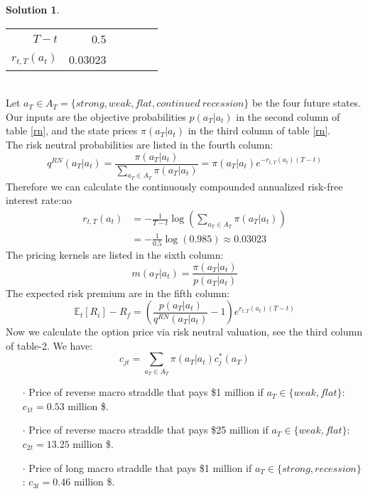 \documentclass[a4paper, 10pt]{article}
\theoremstyle{definition}
\theoremstyle{hSol}
\newtheorem*{solution}{Solution}
\begin{document}
\begin{solution}
\begin{table}[htbp]
\begin{tabular}{rrrrrr}
    $T-t$ & 0.5 \\
    $r_{t,T}(a_t)$ & 0.03023 \\
    \bottomrule
    \end{tabular}%
  \label{tab:addlabel}%
\end{table}%
~\\
Let $a_T \in A_T = \{strong, weak, flat, continued~recession\}$ be the four future states. Our inputs are the objective probabilities $p(a_T|a_t)$ in the second column of table \ref{rn}, and the state prices $\pi(a_T|a_t)$ in the third column of table \ref{rn}. \\
The risk neutral probabilities are listed in the fourth column:
\begin{equation}
  q^{RN}(a_T|a_t) = \frac{\pi(a_T|a_t)}{\sum_{a_T\in A_T}\pi(a_T|a_t)} = \pi(a_T|a_t)e^{-r_{t,T}(a_t)(T-t)}
\end{equation}
Therefore we can calculate the continuously compounded annualized risk-free interest rate:uo
\begin{equation}
  \begin{split}
     r_{t,T}(a_t) &= -\frac{1}{T-t}\log\left(\sum_{a_T\in A_T}\pi(a_T|a_t)\right)\\
     &= - \frac{1}{0.5}\log(0.985) \approx 0.03023
  \end{split}
\end{equation}
The pricing kernels are listed in the sixth column:
\begin{equation}
  m(a_T|a_t) = \frac{\pi(a_T|a_t)}{p(a_T|a_t)} 
\end{equation}
The expected risk premium are in the fifth column:
\begin{equation}
  \mathbb{E}_t\left[R_i\right] - R_f = \left(\frac{p(a_T|a_t)}{q^{RN}(a_T|a_t)}-1\right) e^{r_{t,T}(a_t)(T-t)}
\end{equation}
Now we calculate the option price via risk neutral valuation, see the third column of table-2. We have:
\begin{equation}
  c_{jt} = \sum_{a_T\in A_T} \pi(a_T|a_t) c_j^*(a_T)
\end{equation}
\begin{itemize}
  \item[$\cdot$] Price of reverse macro straddle that pays \$1 million if $a_T \in \{weak, flat\}$: $c_{1t} = 0.53$ million \$.
  \item[$\cdot$] Price of reverse macro straddle that pays \$25 million if $a_T \in \{weak, flat\}$: $c_{2t} = 13.25$ million \$.
  \item[$\cdot$] Price of long macro straddle that pays \$1 million if $a_T \in \{strong, recession\}$: $c_{3t} = 0.46$ million \$.

\end{itemize}
\end{solution}
\end{document}
